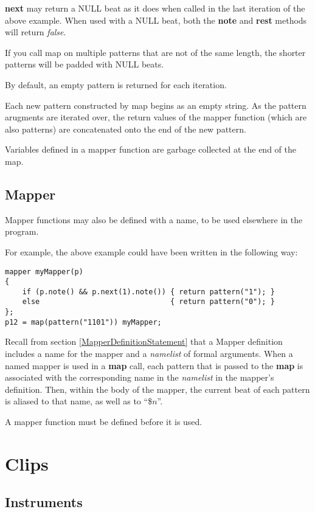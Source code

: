 \textbf{next} may return a NULL beat as it does when called in the last iteration of the above example.  When used with a NULL beat, both the \textbf{note} and \textbf{rest} methods will return \textit{false}.

If you call map on multiple patterns that are not of the same length, the shorter patterns will be padded with NULL beats.

By default, an empty pattern is returned for each iteration.

Each new pattern constructed by map begins as an empty string.  As the pattern arugments are iterated over, the return values of the mapper function (which are also patterns) are concatenated onto the end of the new pattern.

Variables defined in a mapper function are garbage collected at the end of the map.

\subsection{Mapper}

Mapper functions may also be defined with a name, to be used elsewhere in the program.

For example, the above example could have been written in the following way:
\begin{verbatim}
mapper myMapper(p)
{
    if (p.note() && p.next(1).note()) { return pattern("1"); }
    else                              { return pattern("0"); }
};
p12 = map(pattern("1101")) myMapper;
\end{verbatim}

Recall from section \ref{MapperDefinitionStatement} that a  Mapper definition includes a name for the mapper and  a \emph{namelist} of formal arguments.
When a named mapper is used in a \textbf{map} call, each pattern that is passed to the \textbf{map} is associated with the corresponding name in the \emph{namelist} in the mapper's definition.
Then, within the body of the mapper, the current beat of each pattern is aliased to that name, as well as to ``\$$n$''.

A mapper function must be defined before it is used.

\section{Clips}

\subsection{Instruments}\label{instrSection}

